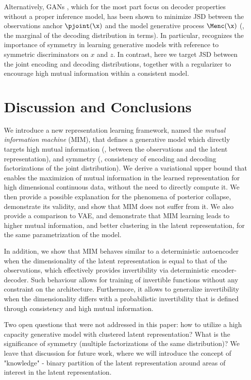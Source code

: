 Alternatively,  GANs \cite{NIPS2014_5423}, which for the most part focus on decoder properties without a proper inference model,
has been shown to minimize JSD between the observations anchor $\pjoint(\x)$ and the model generative process $\Menc(\x)$ (\ie, the marginal of the decoding distribution in \MIM terms). 
In particular, \citep{DonahueKD16-BiGAN,Bang-BiGAN2018} recognizes the importance of symmetry in learning generative models with reference to symmetric discriminators on $x$ and $z$. In contrast, here we target JSD between the joint encoding and decoding distributions, together with a regularizer to encourage high mutual information within a consistent model.


\section{Discussion and Conclusions} \label{sec:conclusion}


We introduce a new representation learning framework, named the {\em mutual information machine} (MIM), that defines a generative model which directly targets high mutual information (\ie, between the observations and the latent representation), and symmetry (\ie, consistency of encoding and decoding factorizations of the joint distribution). We derive a variational upper bound that enables the maximizion of mutual information in the learned representation for high dimensional continuous data, without the need to directly compute it. We then provide a possible explanation for the phenomena of posterior collapse, demonstrate  its validity, and show that MIM does not suffer from it. We also provide a comparison to VAE, and demonstrate that MIM learning leads to higher mutual information, and better clustering in the latent representation, for the same parametrization of the model. 

In addition, we show that MIM behaves similar to a deterministic autoencoder when the dimensionality of the latent representation is equal to that of the observations, which effectively provides invertibility via deterministic encoder-decoder. Such behaviour allows for training of invertible functions without any constraint on the architecture. Furthermore, it allows to generalize invertibility when the dimensionality differs with a probabilistic invertibility that is defined through consistency and high mutual information.

Two open questions that were not addressed in this paper: how to utilize a high capacity generative model with clustered latent representation? What is the significance of symmetry (multiple factorizations of the same distribution)? We leave that discussion for future work, where we will introduce the concept of "knowledge" - binary partition of the latent representation around areas of interest in the latent representation.
